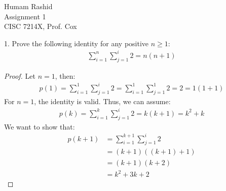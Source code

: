 \documentclass{scrartcl}
\begin{document}
\begin{flushleft}

    Humam Rashid\\
    Assignment 1\\
    CISC 7214X, Prof. Cox\\
    \bigskip
    
    1. Prove the following identity for any positive $n \geq 1$:
    \begin{align*}
        \sum_{i=1}^{n}\sum_{j=1}^{i} 2 = n (n + 1)
    \end{align*}

    \begin{proof}
        Let $n = 1$, then:
        \begin{align}
            p(1) = \sum_{i=1}^{1}\sum_{j=1}^{i} 2 = \sum_{i=1}^{1}\sum_{j=1}^{1} 2 = 2 = 1 (1 + 1)
        \end{align}
        For $n = 1$, the identity is valid. Thus, we can assume:
        \begin{align}
            p(k) = \sum_{i=1}^{k}\sum_{j=1}^{i} 2 = k (k + 1) = k^2 + k
        \end{align}
        We want to show that:
        \begin{align}
            p(k + 1) &= \sum_{i=1}^{k + 1}\sum_{j=1}^{i} 2 \\
                     &= (k + 1) ((k + 1) + 1) \\
                     &= (k + 1) (k + 2) \\
                     &= k^2 + 3k + 2
        \end{align}
    \end{proof}

\end{flushleft}
\end{document}
